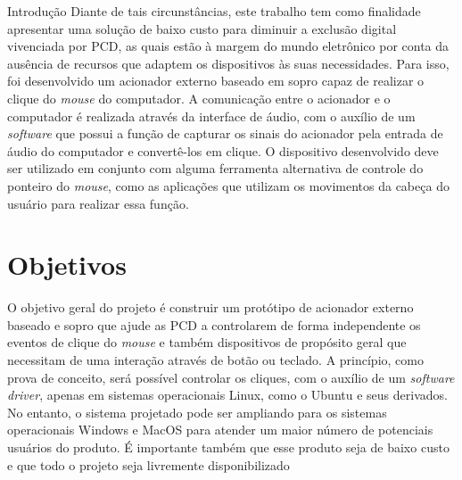 \begin{chapter}{Introdução}
Diante de tais circunstâncias, este trabalho tem como finalidade apresentar  uma
solução de baixo custo para diminuir a exclusão digital vivenciada por PCD, 
as quais estão à margem do mundo eletrônico por conta da ausência de recursos 
que adaptem os dispositivos às suas necessidades. Para isso, foi desenvolvido 
um acionador externo baseado em sopro capaz de realizar o clique do 
\textit{mouse} do computador. A comunicação entre o acionador e o computador é
realizada através da interface de áudio, com o auxílio de um \textit{software}
que possui a função de capturar os sinais do acionador pela entrada de áudio do
computador e convertê-los em clique. O dispositivo desenvolvido deve ser
utilizado em conjunto com alguma ferramenta alternativa de controle do ponteiro 
do \textit{mouse}, como as aplicações que utilizam os movimentos da cabeça
do usuário para realizar essa função. 


\section{Objetivos}

O objetivo geral do projeto é construir um protótipo de acionador externo
baseado e sopro que ajude as PCD a controlarem de forma independente os eventos
de clique do \textit{mouse} e também dispositivos de propósito geral que
necessitam de uma interação através de botão ou teclado. A princípio, como prova
de conceito, será possível controlar os cliques, com o auxílio de um
\textit{software driver}, apenas em sistemas operacionais Linux, como o Ubuntu e
seus derivados. No entanto, o sistema projetado pode ser ampliando para os
sistemas operacionais Windows e MacOS para atender um maior número de potenciais
usuários do produto. É importante também que esse produto seja de baixo custo e
que todo o projeto seja livremente disponibilizado%



\end{chapter}
